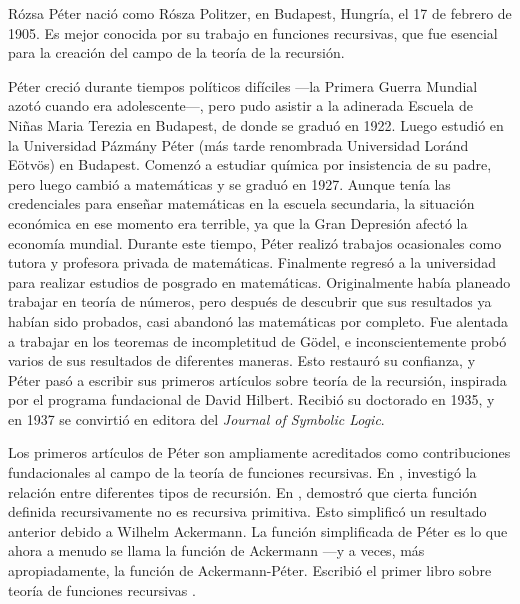 \documentclass[../../../include/open-logic-section]{subfiles}
\begin{document}



R\'ozsa P\'eter nació como R\'osza Politzer, en Budapest, Hungría, el 17 de febrero de 1905. Es mejor conocida por su trabajo en funciones recursivas, que fue esencial para la creación del campo de la teoría de la recursión.

P\'eter creció durante tiempos políticos difíciles —la Primera Guerra Mundial azotó cuando era adolescente—, pero pudo asistir a la adinerada Escuela de Niñas Maria Terezia en Budapest, de donde se graduó en 1922. Luego estudió en la Universidad P\'azm\'any P\'eter (más tarde renombrada Universidad Lor\'and E\"otv\"os) en Budapest. Comenzó a estudiar química por insistencia de su padre, pero luego cambió a matemáticas y se graduó en 1927. Aunque tenía las credenciales para enseñar matemáticas en la escuela secundaria, la situación económica en ese momento era terrible, ya que la Gran Depresión afectó la economía mundial. Durante este tiempo, P\'eter realizó trabajos ocasionales como tutora y profesora privada de matemáticas. Finalmente regresó a la universidad para realizar estudios de posgrado en matemáticas. Originalmente había planeado trabajar en teoría de números, pero después de descubrir que sus resultados ya habían sido probados, casi abandonó las matemáticas por completo. Fue alentada a trabajar en los teoremas de incompletitud de G\"odel, e inconscientemente probó varios de sus resultados de diferentes maneras. Esto restauró su confianza, y P\'eter pasó a escribir sus primeros artículos sobre teoría de la recursión, inspirada por el programa fundacional de David Hilbert. Recibió su doctorado en 1935, y en 1937 se convirtió en editora del \emph{Journal of Symbolic Logic}.

Los primeros artículos de P\'eter son ampliamente acreditados como contribuciones fundacionales al campo de la teoría de funciones recursivas. En \cite{Peter1935a}, investigó la relación entre diferentes tipos de recursión. En \cite{Peter1935b}, demostró que cierta función definida recursivamente no es recursiva primitiva. Esto simplificó un resultado anterior debido a Wilhelm Ackermann. La función simplificada de P\'eter es lo que ahora a menudo se llama la función de Ackermann —y a veces, más apropiadamente, la función de Ackermann-P\'eter. Escribió el primer libro sobre teoría de funciones recursivas \citep{Peter1951}.
\end{document}
